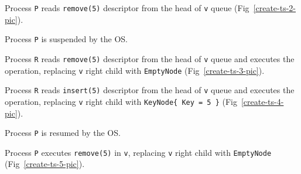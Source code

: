 \documentclass[times, dvipsnames,%
               languages={russian,english} %
              ]{itmo-student-thesis}
\begin{document}
\begin{nenum}
    \item Process \texttt{P} reads \texttt{remove(5)} descriptor from the head of \texttt{v} queue (Fig~\ref{create-ts-2-pic}).
    
    \item Process \texttt{P} is suspended by the OS.
    
    \item Process \texttt{R} reads \texttt{remove(5)} descriptor from the head of \texttt{v} queue and executes the operation, replacing \texttt{v} right child with \texttt{EmptyNode} (Fig~\ref{create-ts-3-pic}).
    
    \item Process \texttt{R} reads \texttt{insert(5)} descriptor from the head of \texttt{v} queue and executes the operation, replacing \texttt{v} right child with \texttt{KeyNode\{ Key = 5 \}} (Fig~\ref{create-ts-4-pic}).
    
    \item Process \texttt{P} is resumed by the OS.
    
    \item Process \texttt{P} executes \texttt{remove(5)} in \texttt{v}, replacing \texttt{v} right child with \texttt{EmptyNode} (Fig~\ref{create-ts-5-pic}).
\end{nenum}
\end{document}
